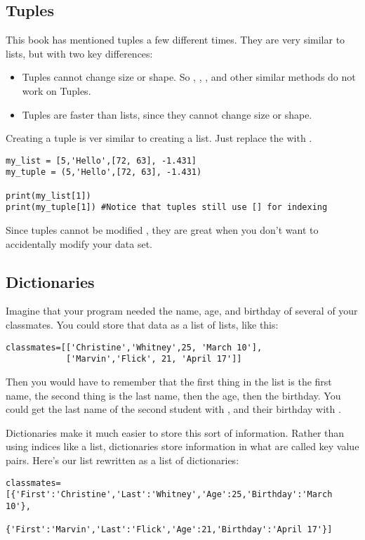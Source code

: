 \subsection*{Tuples}
This book has mentioned tuples a few different times.  They are very similar to lists, but with two key differences:
\begin{itemize}
\item Tuples cannot change size or shape.  So , , , and other similar methods do not work on Tuples.
\item Tuples are faster than lists, since they cannot change size or shape.
\end{itemize}
Creating a tuple is ver similar to creating a list. Just replace the \code{[]} with \code{()}.
\begin{Verbatim}
my_list = [5,'Hello',[72, 63], -1.431]
my_tuple = (5,'Hello',[72, 63], -1.431)

print(my_list[1])
print(my_tuple[1]) #Notice that tuples still use [] for indexing
\end{Verbatim}

Since tuples cannot be modified , they are great when you don't want
to accidentally modify your data set.
\subsection*{Dictionaries}
Imagine that your program needed the name, age, and birthday of several of your classmates.  You could store that data as a list of lists, like this:
\begin{Verbatim}
classmates=[['Christine','Whitney',25, 'March 10'],
            ['Marvin','Flick', 21, 'April 17']]
\end{Verbatim}
Then you would have to remember that the first thing in the list is the first name, the second thing is the last name, then the age, then the birthday. You could get the last name of the second student with , and their birthday with .

Dictionaries make it much easier to store this sort of information.  Rather than using indices like a list, dictionaries store information in what are called key value pairs.  Here's our  list rewritten as a list of dictionaries:

\begin{Verbatim}
classmates=[{'First':'Christine','Last':'Whitney','Age':25,'Birthday':'March 10'},
            {'First':'Marvin','Last':'Flick','Age':21,'Birthday':'April 17'}]
\end{Verbatim}

